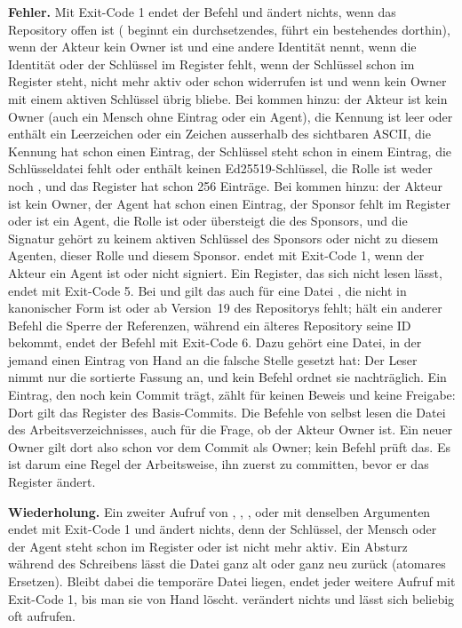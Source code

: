 {\bf Fehler.} Mit Exit-Code 1 endet der Befehl und ändert nichts, wenn das Repository offen ist
( beginnt ein durchsetzendes,
 führt ein bestehendes dorthin), wenn der Akteur kein Owner ist und eine
andere Identität nennt, wenn die Identität oder der Schlüssel im Register fehlt,
wenn der Schlüssel schon im Register steht, nicht mehr aktiv oder schon widerrufen ist
und wenn kein Owner mit einem aktiven Schlüssel übrig bliebe.
Bei  kommen hinzu: der Akteur ist kein Owner (auch ein Mensch ohne Eintrag oder
ein Agent), die Kennung ist leer oder enthält ein Leerzeichen oder ein Zeichen ausserhalb des
sichtbaren ASCII, die Kennung hat schon einen Eintrag, der Schlüssel steht schon in einem Eintrag,
die Schlüsseldatei fehlt oder enthält keinen Ed25519-Schlüssel, die Rolle ist weder
 noch , und das Register hat schon 256 Einträge.
Bei  kommen hinzu: der Akteur ist kein Owner, der Agent hat schon einen Eintrag,
der Sponsor fehlt im Register oder ist ein Agent, die Rolle ist  oder übersteigt die
des Sponsors, und die Signatur gehört zu keinem aktiven Schlüssel des Sponsors oder nicht zu
diesem Agenten, dieser Rolle und diesem Sponsor.
 endet mit Exit-Code 1, wenn der Akteur ein Agent ist oder 
nicht signiert.
Ein Register, das sich nicht lesen lässt, endet mit Exit-Code 5.
Bei  und  gilt das auch für eine Datei , die
nicht in kanonischer Form ist oder ab Version~19 des Repositorys fehlt;
hält ein anderer Befehl die Sperre der Referenzen, während ein älteres Repository seine ID
bekommt, endet der Befehl mit Exit-Code 6.
Dazu gehört eine Datei, in der jemand einen Eintrag von Hand an die falsche Stelle gesetzt hat:
Der Leser nimmt nur die sortierte Fassung an, und kein Befehl ordnet sie nachträglich.
Ein Eintrag, den noch kein Commit trägt, zählt für keinen Beweis und keine Freigabe:
Dort gilt das Register des Basis-Commits.
Die Befehle von  selbst lesen die Datei des Arbeitsverzeichnisses,
auch für die Frage, ob der Akteur Owner ist.
Ein neuer Owner gilt dort also schon vor dem Commit als Owner; kein Befehl prüft das.
Es ist darum eine Regel der Arbeitsweise, ihn zuerst zu committen, bevor er das Register ändert.

{\bf Wiederholung.} Ein zweiter Aufruf von , , ,
 oder  mit denselben Argumenten endet mit Exit-Code 1
und ändert nichts, denn der Schlüssel, der Mensch oder der Agent steht schon im Register
oder ist nicht mehr aktiv.
Ein Absturz während des Schreibens lässt die Datei ganz alt oder ganz neu zurück (atomares
Ersetzen). Bleibt dabei die temporäre Datei  liegen, endet jeder
weitere Aufruf mit Exit-Code 1, bis man sie von Hand löscht.
 verändert nichts und lässt sich beliebig oft aufrufen.

